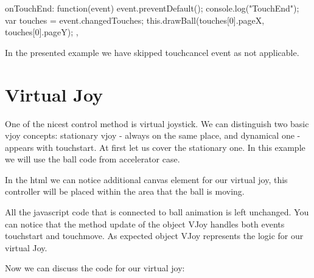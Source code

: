 \begin{js}
    onTouchEnd: function(event){
		event.preventDefault();
		console.log("TouchEnd");
		var touches = event.changedTouches;
		this.drawBall(touches[0].pageX, touches[0].pageY);
	},
		
\end{js}

In the presented example we have skipped touchcancel event as not applicable.

\section{Virtual Joy}
One of the nicest control method is virtual joystick. We can distinguish two basic vjoy concepts: stationary vjoy - always on the same place, and dynamical one - appears with touchstart. At first let us cover the stationary one. In this example we will use the ball code from accelerator case.


In the html we can notice additional canvas element for our virtual joy, this controller will be placed within the area that the ball is moving.



\begin{explain}
All the javascript code that is connected to ball animation is left unchanged. You can notice that the method update  of the object VJoy handles both events touchstart and touchmove. As expected object VJoy represents the logic for our virtual Joy.
\end{explain}

Now we can discuss the code for  our virtual joy:



